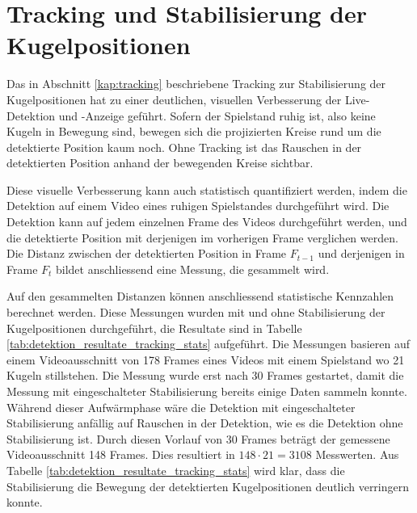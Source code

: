 \section{Tracking und Stabilisierung der Kugelpositionen}
Das in Abschnitt \ref{kap:tracking} beschriebene Tracking zur Stabilisierung der Kugelpositionen hat zu einer deutlichen,
visuellen Verbesserung der Live-Detektion und -Anzeige geführt.
Sofern der Spielstand ruhig ist, also keine Kugeln in Bewegung sind, bewegen sich die
projizierten Kreise rund um die detektierte Position kaum noch.
Ohne Tracking ist das Rauschen in der detektierten Position anhand der bewegenden Kreise sichtbar.

Diese visuelle Verbesserung kann auch statistisch quantifiziert werden, indem die Detektion auf einem Video eines
ruhigen Spielstandes durchgeführt wird. Die Detektion kann auf jedem einzelnen Frame des Videos durchgeführt werden, und
die detektierte Position mit derjenigen im vorherigen Frame verglichen werden.
Die Distanz zwischen der detektierten Position in Frame $F_{t-1}$ und derjenigen in Frame $F_{t}$ bildet anschliessend
eine Messung, die gesammelt wird.

Auf den gesammelten Distanzen können anschliessend statistische Kennzahlen berechnet werden.
Diese Messungen wurden mit und ohne Stabilisierung der Kugelpositionen durchgeführt, die Resultate sind in Tabelle \ref{tab:detektion_resultate_tracking_stats} aufgeführt.
Die Messungen basieren auf einem Videoausschnitt von 178 Frames eines Videos mit einem Spielstand wo 21 Kugeln stillstehen.
Die Messung wurde erst nach 30 Frames gestartet, damit die Messung mit eingeschalteter Stabilisierung bereits einige
Daten sammeln konnte.
Während dieser Aufwärmphase wäre die Detektion mit eingeschalteter Stabilisierung anfällig auf Rauschen in der Detektion,
wie es die Detektion ohne Stabilisierung ist.
Durch diesen Vorlauf von 30 Frames beträgt der gemessene Videoausschnitt 148 Frames.
Dies resultiert in $148 \cdot 21 = 3108$ Messwerten.
Aus Tabelle \ref{tab:detektion_resultate_tracking_stats} wird klar, dass die Stabilisierung die Bewegung der
detektierten Kugelpositionen deutlich verringern konnte.

